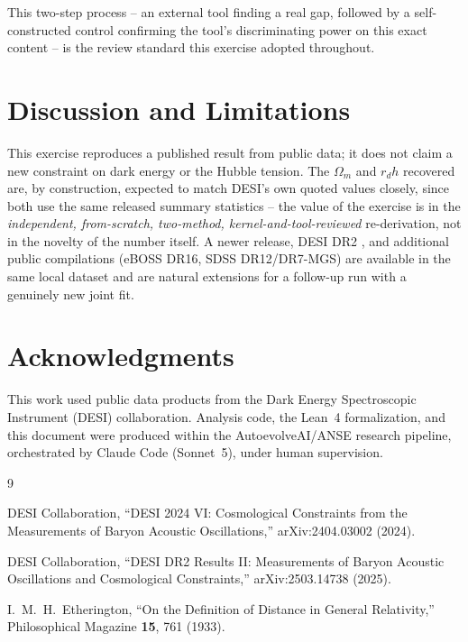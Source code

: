 \documentclass[11pt]{article}
\begin{document}
This two-step process -- an external tool finding a real gap, followed by a
self-constructed control confirming the tool's discriminating power on this
exact content -- is the review standard this exercise adopted throughout.

\section{Discussion and Limitations}

This exercise reproduces a published result from public data; it does not
claim a new constraint on dark energy or the Hubble tension. The
$\Omega_m$ and $r_d h$ recovered are, by construction, expected to match
DESI's own quoted values closely, since both use the same released summary
statistics -- the value of the exercise is in the \emph{independent,
from-scratch, two-method, kernel-and-tool-reviewed} re-derivation, not in
the novelty of the number itself. A newer release, DESI DR2
\cite{desi2025dr2}, and additional public compilations (eBOSS DR16, SDSS
DR12/DR7-MGS) are available in the same local dataset and are natural
extensions for a follow-up run with a genuinely new joint fit.

\section*{Acknowledgments}
This work used public data products from the Dark Energy Spectroscopic
Instrument (DESI) collaboration. Analysis code, the Lean~4 formalization,
and this document were produced within the AutoevolveAI/ANSE research
pipeline, orchestrated by Claude Code (Sonnet~5), under human supervision.

\begin{thebibliography}{9}

DESI Collaboration, ``DESI 2024 VI: Cosmological Constraints from the
Measurements of Baryon Acoustic Oscillations,'' arXiv:2404.03002 (2024).

DESI Collaboration, ``DESI DR2 Results II: Measurements of Baryon Acoustic
Oscillations and Cosmological Constraints,'' arXiv:2503.14738 (2025).

I.~M.~H.~Etherington, ``On the Definition of Distance in General
Relativity,'' Philosophical Magazine \textbf{15}, 761 (1933).

\end{thebibliography}
\end{document}
